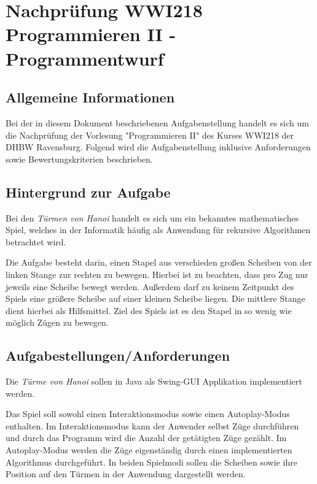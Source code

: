 \documentclass[a4paper,
			   fontsize=12pt]{article}
\begin{document}
\section*{Nachprüfung WWI218 Programmieren II - Programmentwurf}

\vspace{0,75cm}

\subsection*{Allgemeine Informationen}
Bei der in diesem Dokument beschriebenen Aufgabenstellung handelt es sich um die Nachprüfung der Vorlesung "Programmieren II" des Kurses WWI218 der DHBW Ravensburg. Folgend wird die Aufgabenstellung
inklusive Anforderungen sowie Bewertungskriterien beschrieben.

\subsection*{Hintergrund zur Aufgabe}
Bei den \textit{Türmen von Hanoi} handelt es sich um ein bekanntes mathematisches Spiel, welches
in der Informatik häufig als Anwendung für rekursive Algorithmen betrachtet wird.

\begin{figure}
\end{figure}

Die Aufgabe besteht darin, einen Stapel aus verschieden großen Scheiben von der linken Stange zur rechten
zu bewegen. Hierbei ist zu beachten, dass pro Zug nur jeweils eine Scheibe bewegt werden. Außerdem darf zu
keinem Zeitpunkt des Spiels eine größere Scheibe auf einer kleinen Scheibe liegen. Die mittlere Stange dient
hierbei als Hilfsmittel. Ziel des Spiels ist es den Stapel in so wenig wie möglich Zügen zu bewegen.

\subsection*{Aufgabestellungen/Anforderungen}

Die \textit{Türme von Hanoi} sollen in Java als Swing-GUI Applikation implementiert werden.

Das Spiel soll sowohl einen Interaktionsmodus sowie einen Autoplay-Modus enthalten. Im Interaktionsmodus kann
der Anwender selbst Züge durchführen und durch das Programm wird die Anzahl der getätigten Züge gezählt. Im Autoplay-Modus
werden die Züge eigenständig durch einen implementierten Algorithmus durchgeführt. In beiden Spielmodi sollen die Scheiben sowie
ihre Position auf den Türmen in der Anwendung dargestellt werden.
\end{document}
